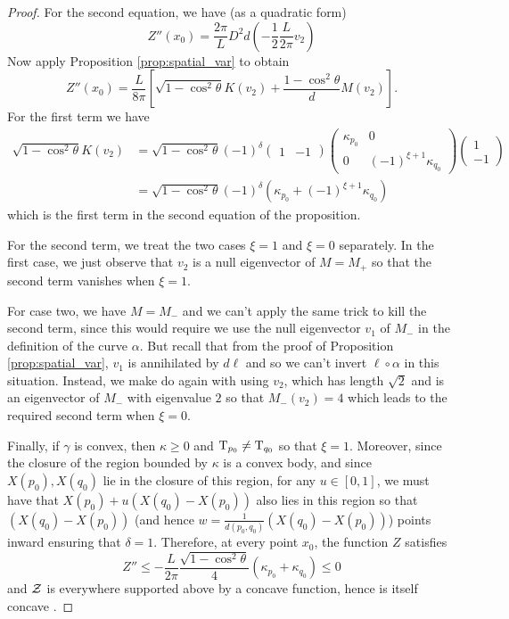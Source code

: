 \documentclass[a4paper, 12pt]{amsart}
\begin{document}
\begin{proof}
For the second equation, we have (as a quadratic form)
\[
Z''(x_0) = \frac{2\pi}{L} D^2 d \left(-\frac{1}{2}\frac{L}{2\pi} v_2\right)
\]
Now apply Proposition \ref{prop:spatial_var} to obtain
\[
Z''(x_0) = \frac{L}{8\pi} \left[\sqrt{1-\cos^2\theta} K (v_2) + \frac{1-\cos^2\theta}{d} M (v_2)\right].
\]
For the first term we have
\begin{align*}
\sqrt{1-\cos^2\theta} K (v_2) &= \sqrt{1-\cos^2\theta} (-1)^{\delta} 
\begin{pmatrix}
1 & -1
\end{pmatrix}
\begin{pmatrix}
\kappa_{p_0} & 0 \\
0 & (-1)^{\xi + 1} \kappa_{q_0}
\end{pmatrix}
\begin{pmatrix}
1 \\
-1
\end{pmatrix} \\
&= \sqrt{1-\cos^2\theta} (-1)^{\delta} (\kappa_{p_0} + (-1)^{\xi + 1} \kappa_{q_0})
\end{align*}
which is the first term in the second equation of the proposition.

For the second term, we treat the two cases $\xi=1$ and $\xi=0$ separately. In the first case, we just observe that $v_2$ is a null eigenvector of $M=M_+$ so that the second term vanishes when $\xi=1$. 

For case two, we have $M=M_-$ and we can't apply the same trick to kill the second term, since this would require we use the null eigenvector $v_1$ of $M_-$ in the definition of the curve $\alpha$. But recall that from the proof of Proposition \ref{prop:spatial_var}, $v_1$ is annihilated by $d\ell$ and so we can't invert $\ell\circ\alpha$ in this situation. Instead, we make do again with using $v_2$, which has length $\sqrt{2}$ and is an eigenvector of $M_-$ with eigenvalue $2$ so that $M_- (v_2) = 4$ which leads to the required second term when $\xi=0$.

Finally, if $\gamma$ is convex, then $\kappa \geq 0$ and $\operatorname{T}_{p_0} \ne \operatorname{T}_{q_0}$ so that $\xi = 1$. Moreover, since the closure of the region bounded by $\kappa$ is a convex body, and since $X(p_0), X(q_0)$ lie in the closure of this region, for any $u \in [0,1]$, we must have that $X(p_0) + u(X(q_0) - X(p_0))$ also lies in this region so that $(X(q_0) - X(p_0))$ (and hence $w = \tfrac{1}{d(p_0,q_0)} (X(q_0) - X(p_0))$) points inward ensuring that $\delta = 1$. Therefore, at every point $x_0$, the function $Z$ satisfies
\[
Z'' \leq - \frac{L}{2\pi} \frac{\sqrt{1-\cos^2 \theta}}{4} (\kappa_{p_0} + \kappa_{q_0}) \leq 0
\]
and $\operatorname{\mathcal{Z}}$ is everywhere supported above by a concave function, hence is itself concave \cite{MR1674097}.
\end{proof}
\end{document}
